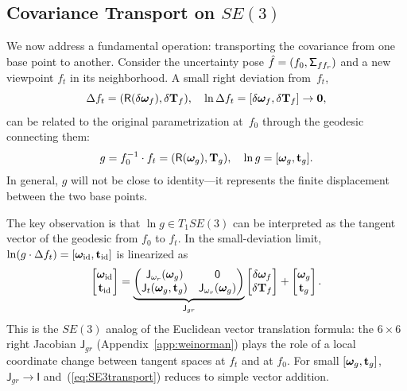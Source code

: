 \documentclass[journal]{IEEEtran}
\newcommand{\bfomega}{\boldsymbol{\omega}}
\newcommand{\sfSigma}[1]{\mathsf{\Sigma}_\mathnormal{#1}}
\newcommand{\beq}{\begin{equation}}
\newcommand{\eeq}{\end{equation}}
\begin{document}
\subsection{Covariance Transport on $SE(3)$}
\label{subsec:covtransport}

We now address a fundamental operation: transporting
the covariance from one base point to another.
Consider the uncertainty pose $\hat{f} = (f_0, \sfSigma{ff_r})$
and a new viewpoint $f_t$ in its neighborhood.
A small right deviation from~$f_t$,
\beq
    \Delta f_t = (\mathsf{R}(\delta\bfomega_f), \delta{\bf T}_f),
    \quad \ln\Delta f_t = [\delta\bfomega_f, \delta{\bf T}_f] \to {\bf 0},
    \label{eq:rightdeviation}
\eeq
can be related to the original parametrization at~$f_0$
through the geodesic connecting them:
\beq
    g = f_0^{-1} \cdot f_t = (\mathsf{R}(\bfomega_g), {\bf T}_g),
    \quad \ln g = [\bfomega_g, {\bf t}_g].
    \label{eq:geodesic}
\eeq
In general, $g$ will not be close to identity---it represents
the finite displacement between the two base points.

The key observation is that $\ln g \in T_1SE(3)$ can be
interpreted as the tangent vector of the geodesic from $f_0$
to $f_t$. In the small-deviation limit,
$\ln(g \cdot \Delta f_t) = [\bfomega_{\rm id}, {\bf t}_{\rm id}]$
is linearized as
\beq
    \begin{bmatrix} \bfomega_{\rm id} \\ {\bf t}_{\rm id} \end{bmatrix}
    = \underbrace{\begin{pmatrix}
    \mathsf{J}_{\omega_r}(\bfomega_g) & \mathsf{0} \\
    \mathsf{J}_t(\bfomega_g, {\bf t}_g) & \mathsf{J}_{\omega_r}(\bfomega_g)
    \end{pmatrix}}_{\mathsf{J}_{gr}}
    \begin{bmatrix} \delta\bfomega_f \\ \delta{\bf T}_f \end{bmatrix}
    + \begin{bmatrix} \bfomega_g \\ {\bf t}_g \end{bmatrix}.
    \label{eq:SE3transport}
\eeq
This is the $SE(3)$ analog of the Euclidean vector translation
formula: the $6\times 6$ right Jacobian $\mathsf{J}_{gr}$
(Appendix~\ref{app:weinorman}) plays the role of a local
coordinate change between tangent spaces at $f_t$ and at $f_0$.
For small $[\bfomega_g, {\bf t}_g]$, $\mathsf{J}_{gr} \to \mathsf{I}$
and~(\ref{eq:SE3transport}) reduces to simple vector addition.
\end{document}

